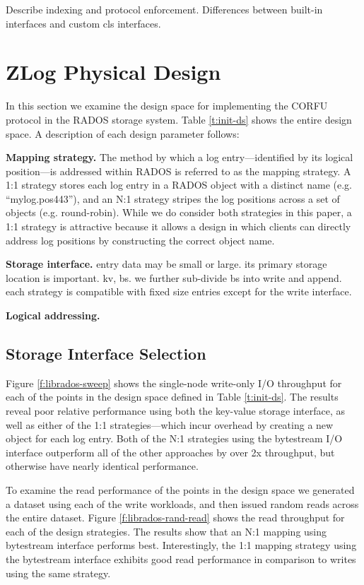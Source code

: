\documentclass[10pt,twocolumn]{article}
\begin{document}
Describe indexing and protocol enforcement.
Differences between built-in interfaces and custom cls interfaces.


\section{ZLog Physical Design}

In this section we examine the design space for implementing the CORFU
protocol in the RADOS storage system. Table \ref{t:init-ds} shows the entire
design space. A description of each design parameter follows:

{\bf Mapping strategy.} The method by which a log entry---identified by its
logical position---is addressed within RADOS is referred to as the mapping
strategy. A 1:1 strategy stores each log entry in a RADOS object with a
distinct name (e.g. ``mylog.pos443''), and an N:1 strategy stripes the log
positions across a set of objects (e.g.  round-robin). While we do consider
both strategies in this paper, a 1:1 strategy is attractive because it allows
a design in which clients can directly address log positions by constructing
the correct object name.

{\bf Storage interface.} entry data may be small or large. its primary
storage location is important. kv, bs. we further sub-divide bs into
write and append. each strategy is compatible with fixed size entries
except for the write interface.

{\bf Logical addressing.}

\subsection{Storage Interface Selection}

Figure \ref{f:librados-sweep} shows the single-node write-only I/O throughput
for each of the points in the design space defined in Table \ref{t:init-ds}.
The results reveal poor relative performance using both the key-value storage
interface, as well as either of the 1:1 strategies---which incur overhead by
creating a new object for each log entry. Both of the N:1 strategies using the
bytestream I/O interface outperform all of the other approaches by over 2x
throughput, but otherwise have nearly identical performance.

To examine the read performance of the points in the design space we generated
a dataset using each of the write workloads, and then issued random reads
across the entire dataset. Figure \ref{f:librados-rand-read} shows the read
throughput for each of the design strategies. The results show that an N:1
mapping using bytestream interface performs best. Interestingly, the 1:1
mapping strategy using the bytestream interface exhibits good read performance
in comparison to writes using the same strategy.
\end{document}
